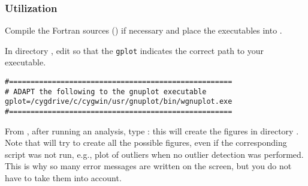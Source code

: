 \subsubsection{Utilization}

Compile the Fortran sources () if necessary and place the executables into .

In directory , edit  so that the \texttt{gplot} indicates the correct path to your \gnuplot executable.
\example\\
\begin{verbatim}
#====================================================
# ADAPT the following to the gnuplot executable
gplot=/cygdrive/c/cygwin/usr/gnuplot/bin/wgnuplot.exe
#====================================================
\end{verbatim}

From , after running an analysis, type : this will create the figures in directory .
Note that  will try to create all the possible figures, even if the corresponding script was not run, e.g., plot of outliers when no outlier detection was performed. This is why so many error messages are written on the screen, but you do not have to take them into account.

%

